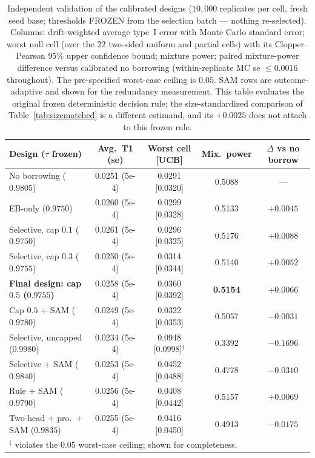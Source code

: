 \documentclass[11pt]{article}
\begin{document}
\begin{table}[htbp]
\centering
\small
\caption{Independent validation of the calibrated designs
($10{,}000$ replicates per cell, fresh seed base; thresholds FROZEN from
the selection batch --- nothing re-selected). Columns: drift-weighted
average type~I error with Monte Carlo standard error; worst null cell
(over the $22$ two-sided uniform and partial cells) with its
Clopper--Pearson $95\%$ upper confidence bound; mixture power; paired
mixture-power difference versus calibrated no borrowing
(within-replicate MC se $\le 0.0016$ throughout). The pre-specified
worst-case ceiling is $0.05$. SAM rows are outcome-adaptive and shown for
the redundancy measurement. This table evaluates the original frozen
deterministic decision rule; the size-standardized comparison of
Table~\ref{tab:sizematched} is a different estimand, and its $+0.0025$
does not attach to this frozen rule.}
\label{tab:calibrated}
\begin{tabular}{lcccc}
\hline
Design ($\tau$ frozen) & Avg.\ T1 (se) & Worst cell [UCB] & Mix.\ power &
$\Delta$ vs no borrow \\
\hline
No borrowing ($0.9805$)      & 0.0251 (5e-4) & 0.0291 [0.0320] & 0.5088 & --- \\
EB-only ($0.9750$)           & 0.0260 (5e-4) & 0.0299 [0.0328] & 0.5133 & $+0.0045$ \\
Selective, cap $0.1$ ($0.9750$) & 0.0261 (5e-4) & 0.0296 [0.0325] & 0.5176 & $+0.0088$ \\
Selective, cap $0.3$ ($0.9755$) & 0.0250 (5e-4) & 0.0314 [0.0344] & 0.5140 & $+0.0052$ \\
\textbf{Final design: cap $0.5$ ($0.9755$)} & 0.0258 (5e-4) & 0.0360 [0.0392]
& \textbf{0.5154} & $\mathbf{+0.0066}$ \\
Cap $0.5$ + SAM ($0.9780$)   & 0.0249 (5e-4) & 0.0322 [0.0353] & 0.5057 & $-0.0031$ \\
Selective, uncapped ($0.9980$) & 0.0234 (5e-4) & 0.0948 [0.0998]$^{\dagger}$ & 0.3392 & $-0.1696$ \\
Selective + SAM ($0.9840$)   & 0.0253 (5e-4) & 0.0452 [0.0488] & 0.4778 & $-0.0310$ \\
Rule + SAM ($0.9790$)        & 0.0256 (5e-4) & 0.0408 [0.0442] & 0.5157 & $+0.0069$ \\
Two-head + pro.\ + SAM ($0.9835$) & 0.0255 (5e-4) & 0.0416 [0.0450] & 0.4913 & $-0.0175$ \\
\hline
\multicolumn{5}{l}{\footnotesize $^{\dagger}$ violates the $0.05$
worst-case ceiling; shown for completeness.}\\
\end{tabular}
\end{table}
\end{document}
